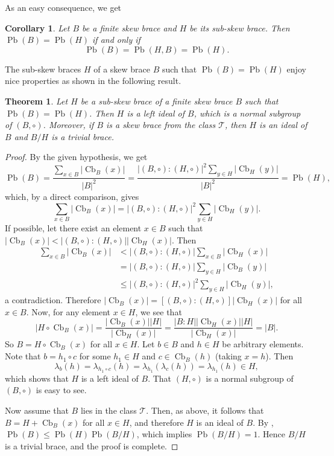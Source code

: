 \documentclass[11pt, oneside]{amsart}
\numberwithin{equation}{section}
\theoremstyle{plain}
\newtheorem{cor}[equation]{Corollary}
\newtheorem{thm}[equation]{Theorem}
\theoremstyle{definition}
\newcommand{\Cb}{\operatorname{Cb} }
\newcommand{\Pb}{\operatorname{Pb} }
\begin{document}
As an easy consequence, we get
\begin{cor}
    Let $B$ be a finite skew brace and $H$ be its sub-skew brace. Then $\Pb(B)=\Pb(H)$ if and only if
    $$\Pb(B)=\Pb(H,B)=\Pb(H).$$
\end{cor}



The sub-skew braces $H$ of a skew brace $B$ such that $\Pb(B)=\Pb(H)$ enjoy nice properties as shown in the following result.

\begin{thm} %
    Let $H$ be a sub-skew brace of a finite skew brace $B$ such that $\Pb(B)=\Pb(H)$. Then $H$ is a left ideal of $B$, which is a normal subgroup of $(B,\circ)$. Moreover, if $B$ is a skew brace from the class $\mathcal{T}$, then  $H$ is an ideal of $B$ and $B/H$ is a trivial brace.
\end{thm}
\begin{proof}   
       By the given hypothesis, we get
       $$ \Pb(B)=\frac{\sum_{x\in B}|\Cb_B(x)|}{|B|^2}= \frac{{|(B,\circ):(H,\circ)|}^2\sum_{y\in H}|\Cb_H(y)|}{|B|^2}=\Pb(H), $$
       which, by a direct comparison, gives
       $$\sum_{x\in B}|\Cb_B(x)|={|(B,\circ):(H,\circ)|}^2\sum_{y\in H}|\Cb_H(y)|.$$
       If possible, let there exist an element $x\in B$ such that $|\Cb_B(x)|<|(B,\circ):(H,\circ)||\Cb_H(x)|$. Then 
       \begin{align*}
           \sum_{x\in B}|\Cb_B(x)|&<{|(B,\circ):(H,\circ)|}\sum_{x\in B}|\Cb_H(x)|\\
                                  &={|(B,\circ):(H,\circ)|}\sum_{y\in H}|\Cb_B(y)|\\
                                  &\leqslant{|(B,\circ):(H,\circ)|}^2\sum_{y\in H}|\Cb_H(y)|,
       \end{align*}
       a contradiction. Therefore  $|\Cb_B(x)|=[(B,\circ):(H,\circ)]|\Cb_H(x)|$ for all $x\in B$. Now, for any element $x\in H$, we see that
           $$
              | H\circ \Cb_B(x) |=\frac{|\Cb_B(x)||H|}{|\Cb_H(x)|}=\frac{|B:H||\Cb_H(x)||H|}{|\Cb_H(x)|}=|B|.
           $$
           So $B=H\circ \Cb_B(x)$ for all $x\in H$. Let $b\in B$ and $h\in H$ be arbitrary elements. Note that $b=h_1\circ c$ for some $h_1\in H$ and $c\in \Cb_ B(h)$ (taking $x = h$). Then 
           $$\lambda_{b}(h)=\lambda_ {h_ 1\circ c}(h)=\lambda_{h_1}(\lambda_c(h))=\lambda_ {h_ 1}(h) \in H,$$
           which shows that $H$ is a left ideal of $B$. That $(H, \circ)$ is a normal subgroup of $(B,\circ)$ is easy to see.

        Now assume that $B$ lies in the class $\mathcal T$.
           Then, as above, it follows that  $B = H + \Cb_B(x)$ for all $x \in H$, and therefore  $H$ is an ideal of $B$. By \cite{MY26}, $\Pb(B)\leqslant \Pb(H)\Pb(B/H)$, which implies  $\Pb(B/H)=1$. Hence $B/H$ is a trivial brace, and the proof is complete.           
\end{proof}
\end{document}
